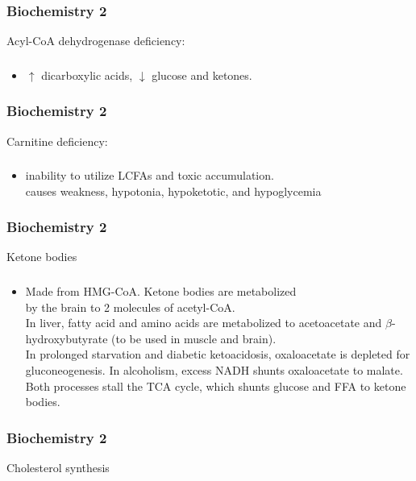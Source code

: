 \documentclass[11pt]{beamer}
\begin{document}
\begin{frame}
 \frametitle{Biochemistry 2}
Acyl-CoA dehydrogenase deficiency:
\end{frame}

\begin{frame}
 \frametitle{}
\begin{itemize}
\item  ${\uparrow}$ dicarboxylic acids, ${\downarrow}$ glucose and ketones.
\end{itemize}
\end{frame}

\begin{frame}
 \frametitle{Biochemistry 2}
Carnitine deficiency:
\end{frame}

\begin{frame}
 \frametitle{}
\begin{itemize}
\item  inability to utilize LCFAs and toxic accumulation. \\ causes weakness, hypotonia, hypoketotic, and hypoglycemia 
\end{itemize}
\end{frame}

\begin{frame}
 \frametitle{Biochemistry 2}
Ketone bodies
\end{frame}

\begin{frame}
 \frametitle{}
\begin{itemize}
\item Made from HMG-CoA. Ketone bodies are metabolized \\ by the brain to 2 molecules of acetyl-CoA. \\ In liver, fatty acid and amino acids are metabolized to acetoacetate and ${\beta}$-hydroxybutyrate (to be used in muscle and brain). \\ In prolonged starvation and diabetic ketoacidosis, oxaloacetate is depleted for gluconeogenesis. In alcoholism, excess NADH shunts oxaloacetate to malate. Both processes stall the TCA cycle, which shunts glucose and FFA to ketone bodies. 
\end{itemize}
\end{frame}

\begin{frame}
 \frametitle{Biochemistry 2}
Cholesterol synthesis
\end{frame}
\end{document}

